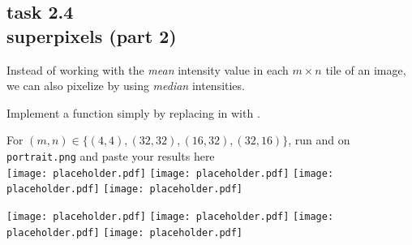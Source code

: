 
\subsection*{task 2.4 \\[1ex] superpixels (part 2)}

Instead of working with the \emph{mean} intensity value in each $m \times n$ tile of an image, we can also pixelize by using \emph{median} intensities.

Implement a function  simply by replacing  in  with .

For $(m, n) \in \bigl\{ (4,4), (32,32), (16,32), (32,16) \bigr\}$, run  and  on \texttt{portrait.png} and paste your results here \\[1cm]
\texttt{[image: placeholder.pdf]} \hfill
\texttt{[image: placeholder.pdf]} \hfill
\texttt{[image: placeholder.pdf]} \hfill
\texttt{[image: placeholder.pdf]} 

\texttt{[image: placeholder.pdf]} \hfill
\texttt{[image: placeholder.pdf]} \hfill
\texttt{[image: placeholder.pdf]} \hfill
\texttt{[image: placeholder.pdf]} 





